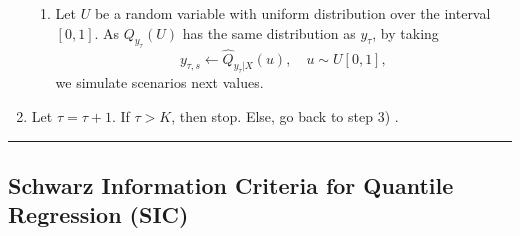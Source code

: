 \begin{enumerate}
\begin{enumerate}
		
		\item Let $U$ be a random variable with uniform distribution over the interval $[0,1]$. As $Q_{y_\tau}(U)$ has the same distribution as $y_\tau$, by taking
		$$y_{\tau,s} \leftarrow \hat Q_{y_\tau | X}(u), \quad u \sim U[0,1],$$
		we simulate scenarios next values.



		 \end{enumerate}
	
	
	\item Let $\tau = \tau + 1$. If $\tau > K$, then stop. Else, go back to step 3) . 


\end{enumerate}

\noindent\rule{\columnwidth}{1pt}


\subsection{Schwarz Information Criteria for Quantile Regression (SIC)} \label{sec:SIC}

